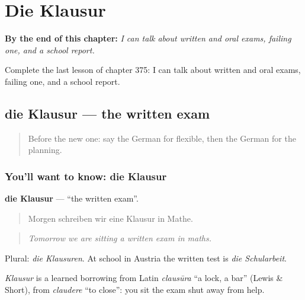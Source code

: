 
\chapter{Die Klausur}
\label{ch:ge-die-klausur}

\begin{chapteropening}
\textbf{By the end of this chapter:} \emph{I can talk about written and oral exams, failing one, and a school report.}

Complete the last lesson of chapter 375: I can talk about written and oral exams, failing one, and a school report.
\end{chapteropening}

\section[die Klausur]{die Klausur — the written exam}

\label{lesson:GE-C375-klausur}



\begin{quote}
Before the new one: say the German for flexible, then the German for the planning.
\end{quote}

\subsection*{You'll want to know: die Klausur}
\textbf{die Klausur} — \textquotedblleft{}the written exam\textquotedblright{}.

\begin{quote}
Morgen schreiben wir eine Klausur in Mathe.
\end{quote}

\begin{quote}
\emph{Tomorrow we are sitting a written exam in maths.}
\end{quote}

Plural: \emph{die Klausuren}. At school in Austria the written test is \emph{die Schularbeit}.

\begin{cousinweb}
\emph{Klausur} is a learned borrowing from Latin \emph{clausūra} \textquotedblleft{}a lock, a bar\textquotedblright{} (Lewis \& Short), from \emph{claudere} \textquotedblleft{}to close\textquotedblright{}: you sit the exam shut away from help.
\end{cousinweb}

